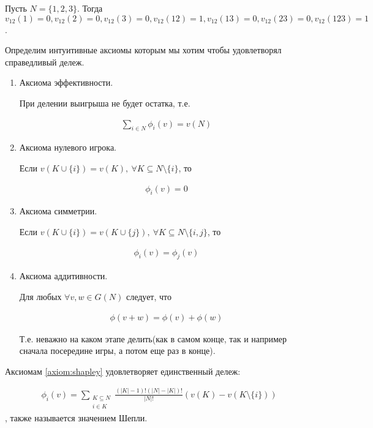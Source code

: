 \documentclass[../main.tex]{subfiles}
\begin{document}
\begin{exmpl}
	Пусть $N = \{1, 2, 3\}$. Тогда $v_{12}(1) = 0, v_{12}(2) = 0, v_{12}(3) = 0, v_{12}(12) = 1, v_{12}(13) = 0, v_{12}(23) = 0, v_{12}(123) = 1$.
\end{exmpl}

Определим интуитивные аксиомы которым мы хотим чтобы удовлетворял справедливый дележ.

\begin{df}[Аксиомы] \label{axiom:shapley}
	\begin{enumerate}
		\item Аксиома эффективности.\label{axiom:shapley_efficenty} 

		При делении выигрыша не будет остатка, т.е. 

		\begin{align*}
			\sum_{i \in N} \phi_i(v) = v(N)
		\end{align*}
		\item Аксиома нулевого игрока. \label{axiom:shapley_zero_player}

		Если $v(K \cup \{i\}) = v(K), \  \forall K \subseteq N \setminus \{i\}$, то 

		\begin{align*}
			\phi_i(v) = 0
		\end{align*}

	\item Аксиома симметрии. \label{axiom:shapley_symmetry}

		Если $v(K \cup \{i\}) = v(K \cup \{j\}), \ \forall K \subseteq N \setminus \{i, j\}$, то 

		\begin{align*}
			\phi_i(v) = \phi_j(v)
		\end{align*}

	\item Аксиома аддитивности. \label{axiom:shapley_additivity}

		Для любых $\forall v, w \in G(N)$ следует, что

		\begin{align*}
			\phi(v + w) = \phi(v) + \phi(w)
		\end{align*}

		Т.е. неважно на каком этапе делить(как в самом конце, так и например сначала посередине игры, а потом еще раз в конце).
	\end{enumerate}
\end{df}

\begin{thm} \label{theorem:shepli}
	Аксиомам \ref{axiom:shapley} удовлетворяет единственный дележ:

	\begin{align*}
		\phi_i(v) = \sum_{\substack{K \subseteq N \\ i \in K}} \frac{(|K| - 1)! (|N| - |K|)!}{|N|!} (v(K) - v(K \setminus \{i\}))
	\end{align*}, также называется значением Шепли.

\end{thm}
\end{document}

